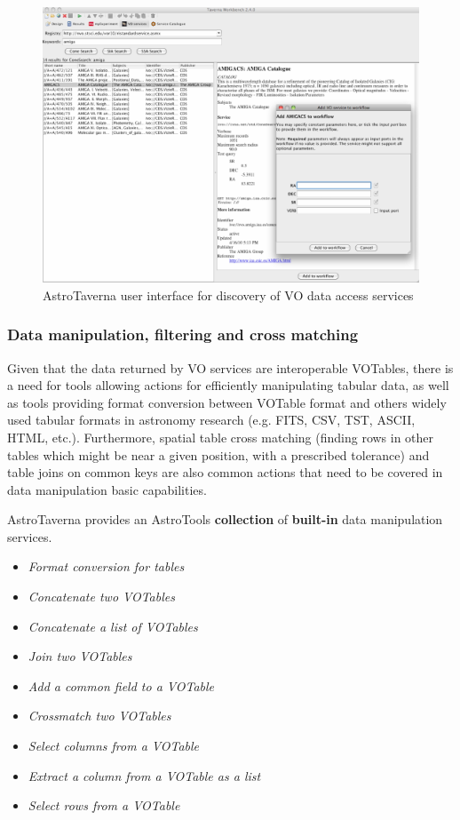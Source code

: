 \documentclass{aa}
\begin{document}
\begin{figure}[tb]
\centering 
\includegraphics[width=0.99\columnwidth]{VODiscovery}
\caption{AstroTaverna user interface for discovery of VO data access services}
\label{fig:VODiscovery}
\end{figure}

\subsubsection{Data manipulation, filtering and cross matching}
\label{DataManipulation}

Given that the data returned by VO services are interoperable VOTables, there is a need for tools allowing actions for efficiently manipulating tabular data, as well as tools providing format conversion between VOTable format and others widely used tabular formats in astronomy research (e.g. FITS, CSV, TST, ASCII, HTML, etc.). Furthermore, spatial table cross matching (finding rows in other tables which might be near a given position, with a prescribed tolerance) and table joins on common keys are also common actions that need to be covered in data manipulation basic capabilities.

AstroTaverna provides an AstroTools \textbf{collection} of \textbf{built-in} data manipulation services.
\begin{itemize}
\item \textit{Format conversion for tables}
\item \textit{Concatenate two VOTables}
\item \textit{Concatenate a list of VOTables}
\item \textit{Join two VOTables}
\item \textit{Add a common field to a VOTable}
\item \textit{Crossmatch two VOTables}
\item \textit{Select columns from a VOTable}
\item \textit{Extract a column from a VOTable as a list}
\item \textit{Select rows from a VOTable}
\end{itemize}
\end{document}
